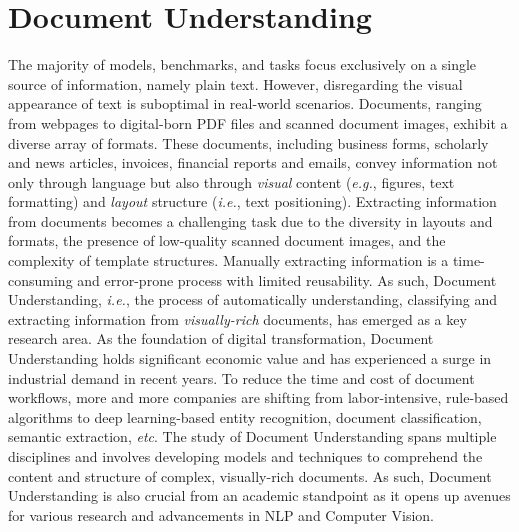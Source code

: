 \chapter{Document Understanding}
\label{chapter:related-document-understanding}


\renewcommand{\leftmark}{\spacedlowsmallcaps{Document Understanding}}


\minitoc


The majority of models, benchmarks, and tasks focus exclusively on a single source of information, namely plain text. However, disregarding the visual appearance of text is suboptimal in real-world scenarios. Documents, ranging from webpages to digital-born PDF files and scanned document images, exhibit a diverse array of formats. These documents, including business forms, scholarly and news articles, invoices, financial reports and emails, convey information not only through language but also through \textit{visual} content (\textit{e.g.}, figures, text formatting) and \textit{layout} structure (\textit{i.e.}, text positioning). Extracting information from documents becomes a challenging task due to the diversity in layouts and formats, the presence of low-quality scanned document images, and the complexity of template structures. Manually extracting information is a time-consuming and error-prone process with limited reusability. As such, Document Understanding, \textit{i.e.}, the process of automatically understanding, classifying and extracting information from \textit{visually-rich} documents, has emerged as a key research area. As the foundation of digital transformation, Document Understanding holds significant economic value and has experienced a surge in industrial demand in recent years. To reduce the time and cost of document workflows, more and more companies are shifting from labor-intensive, rule-based algorithms to deep learning-based entity recognition, document classification, semantic extraction, \textit{etc}. The study of Document Understanding spans multiple disciplines and involves developing models and techniques to comprehend the content and structure of complex, visually-rich documents. As such, Document Understanding is also crucial from an academic standpoint as it opens up avenues for various research and advancements in \ac{NLP} and Computer Vision. 

